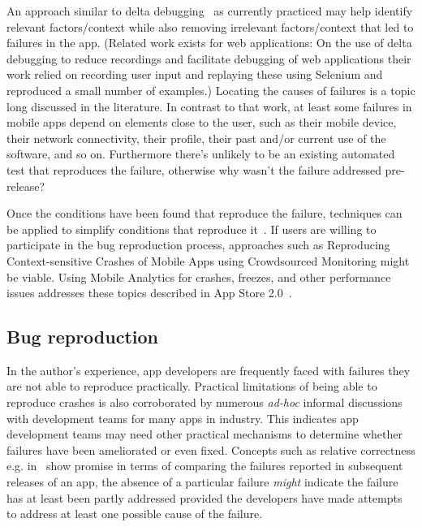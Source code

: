 An approach similar to delta debugging~ as currently practiced may help identify relevant factors/context while also removing irrelevant factors/context that led to failures in the app. (Related work exists for web applications: On the use of delta debugging to reduce recordings and facilitate debugging of web applications their work relied on recording user input and replaying these using Selenium and reproduced a small number of examples.) Locating the causes of failures is a topic long discussed in the literature. In contrast to that work, at least some failures in mobile apps depend on elements close to the user, such as their mobile device, their network connectivity, their profile, their past and/or current use of the software, and so on. Furthermore there’s unlikely to be an existing automated test that reproduces the failure, otherwise why wasn't the failure addressed pre-release?

Once the conditions have been found that reproduce the failure, techniques can be applied to simplify conditions that reproduce it~. If users are willing to participate in the bug reproduction process, approaches such as Reproducing Context-sensitive Crashes of Mobile Apps using Crowdsourced Monitoring might be viable. Using Mobile Analytics for crashes, freezes, and other performance issues addresses these topics described in App Store 2.0~. 

\subsection{Bug reproduction}
In the author's experience, app developers are frequently faced with failures they are not able to reproduce practically. Practical limitations of being able to reproduce crashes is also corroborated by numerous \emph{ad-hoc} informal discussions with development teams for many apps in industry. This indicates app development teams may need other practical mechanisms to determine whether failures have been ameliorated or even fixed. Concepts such as relative correctness e.g. in~ show promise in terms of comparing the failures reported in subsequent releases of an app, the absence of a particular failure \emph{might} indicate the failure has at least been partly addressed provided the developers have made attempts to address at least one possible cause of the failure.

